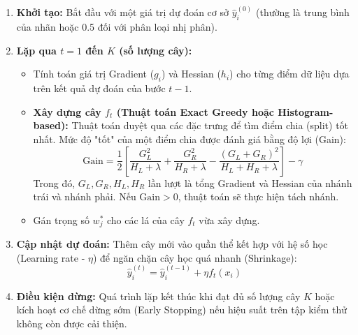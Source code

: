 \begin{enumerate}
    \item \textbf{Khởi tạo:} Bắt đầu với một giá trị dự đoán cơ sở $\hat{y}_i^{(0)}$ (thường là trung bình của nhãn hoặc 0.5 đối với phân loại nhị phân).
    \item \textbf{Lặp qua $t = 1$ đến $K$ (số lượng cây):}
    \begin{itemize}
        \item Tính toán giá trị Gradient ($g_i$) và Hessian ($h_i$) cho từng điểm dữ liệu dựa trên kết quả dự đoán của bước $t-1$.
        \item \textbf{Xây dựng cây $f_t$ (Thuật toán Exact Greedy hoặc Histogram-based):} Thuật toán duyệt qua các đặc trưng để tìm điểm chia (split) tốt nhất. Mức độ "tốt" của một điểm chia được đánh giá bằng độ lợi (Gain):
        \begin{equation}
        \text{Gain} = \frac{1}{2} \left[ \frac{G_L^2}{H_L + \lambda} + \frac{G_R^2}{H_R + \lambda} - \frac{(G_L + G_R)^2}{H_L + H_R + \lambda} \right] - \gamma
        \end{equation}
        Trong đó, $G_L, G_R, H_L, H_R$ lần lượt là tổng Gradient và Hessian của nhánh trái và nhánh phải. Nếu $\text{Gain} > 0$, thuật toán sẽ thực hiện tách nhánh.
        \item Gán trọng số $w_j^*$ cho các lá của cây $f_t$ vừa xây dựng.
    \end{itemize}
    \item \textbf{Cập nhật dự đoán:} Thêm cây mới vào quần thể kết hợp với hệ số học (Learning rate - $\eta$) để ngăn chặn cây học quá nhanh (Shrinkage):
    \begin{equation}
    \hat{y}_i^{(t)} = \hat{y}_i^{(t-1)} + \eta f_t(x_i)
    \end{equation}
    \item \textbf{Điều kiện dừng:} Quá trình lặp kết thúc khi đạt đủ số lượng cây $K$ hoặc kích hoạt cơ chế dừng sớm (Early Stopping) nếu hiệu suất trên tập kiểm thử không còn được cải thiện.
\end{enumerate}
